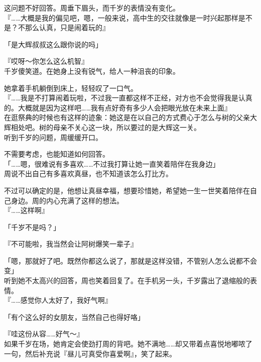 这问题不好回答。周垂下眉头，而千岁的表情没有变化。\\

『……大概是我的偏见吧，嗯，一般来说，高中生的交往就像是一时兴起那样是不是？不那么认真，只是闹着玩的』

「是大辉叔叔这么跟你说的吗」

『哎呀～你怎么这么机智』\\

千岁傻笑道。在她身上没有锐气，给人一种沮丧的印象。

她拿着手机躺倒到床上，轻轻叹了一口气。\\

『……我是不打算闹着玩啦，不过我一直都这样不正经，对方也不会觉得我是认真的。大概就是因为这样吧……我有点好奇有多少人会把眼光放在未来上面』\\

在逛祭典的时候也有这样的迹象：她这是在以自己的方式费心于怎么与树的父亲大辉相处吧。树的母亲不关心这一块，所以要过的是大辉这一关。\\

听到千岁的问题，周缓缓开口。

不需要考虑，也能知道如何回答。\\

「……嗯，很难说有多喜欢……不过我打算让她一直笑着陪伴在我身边」\\

周说不出自己有多喜欢真昼，也不知道该怎么打比方。

不过可以确定的是，他想让真昼幸福，想要珍惜她，希望她一生一世笑着陪伴在自己身边。周的内心充满了这样的想法。\\

『……这样啊』

「千岁不是吗？」

『不可能啦，我当然会让阿树爆笑一辈子』

「嗯，那就好了吧。既然你都这么说了，那就是这样没错，不管别人怎么说都不会变」\\

听到她不太高兴的回答，周也笑着回复了。在手机另一头，千岁露出了退缩般的表情。\\

『……感觉你人太好了，我好气啊』

「有个这么好的女朋友，当然自己也得好咯」

『哇这份从容……好气～』\\

如果千岁在场，她肯定会使劲打周的背吧。她不满地……却又带着点喜悦地嘟哝了一句，然后补充说『昼儿可真受你喜爱啊』，笑了起来。\\

